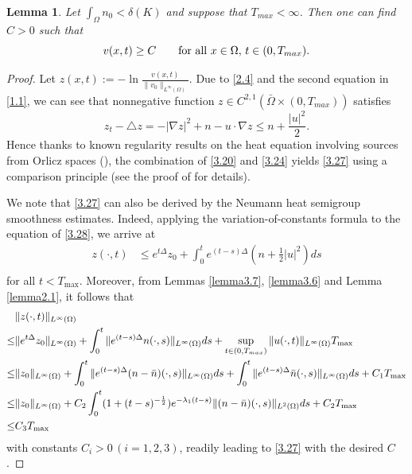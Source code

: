 \documentclass[12pt]{article}
\theoremstyle{plain}
\newtheorem{lemma}{Lemma}[section]
\theoremstyle{definition}
\numberwithin{equation}{section}
\begin{document}
\begin{lemma}\label{lemma3.9}Let $\int_\Omega n_0<\delta(K)$ and suppose that $T_{max}<\infty$.  Then one can find  $C>0$  such that
\begin{equation}\label{3.27}
v(x,t)\geq C\quad\quad \hbox {for all}\,\, x\in \Omega, \,t\in (0,T_{max}).
\end{equation}
\end{lemma}
 \begin{proof}[Proof]
 Let $z(x,t):=-\ln\frac{v(x,t)}{\|v_{0}\|_{L^{\infty}(\Omega)}}$. Due to \eqref{2.4} and the second equation in \eqref{1.1}, we can see that nonnegative function
 $z\in  C^{2,1}(\bar{\Omega}\times(0,T_{max}))$ satisfies
 \begin{equation}\label{3.28}
 z_t-\triangle z=-|\nabla z|^2+n-u\cdot \nabla z\leq n+\frac{|u|^2}2.
\end{equation}
Hence thanks to known regularity results on the heat equation involving sources from Orlicz spaces (\cite [Corollary 1.3]{WinkleIMRN}), the combination of \eqref{3.20} and \eqref{3.24} yields  \eqref{3.27} using a comparison principle (see the proof of \cite [Lemma 3.7]{Fuest} for details).

We note that \eqref{3.27} can also be derived by the Neumann heat semigroup smoothness estimates. Indeed, applying the variation-of-constants formula to the  equation of \eqref{3.28}, we arrive at
	\begin{equation}\label{3.29}
		\begin{split}
			z(\cdot,t)&\leq e^{t\Delta}z_{0}+\int_{0}^{t}e^{(t-s)\Delta}( n+\frac 12 |u|^2) ds\\
					\end{split}
	\end{equation}
	for all $t<T_{\max}$. Moreover, from Lemmas \ref{lemma3.7}, \ref{lemma3.6} and Lemma \ref{lemma2.1},   it follows that
	\begin{align}\label{3.30}
	&\|z(\cdot,t)\|_{L^{\infty}(\Omega)}\notag\\
\leq
&\|e^{t\Delta}z_{0}\|_{L^{\infty}(\Omega)}+\int_{0}^{t}\|e^{(t-s)\Delta}n(\cdot,s)\|_{L^{\infty}(\Omega)}ds
+
\sup_{t\in (0,T_{max})}\|u(\cdot,t)\|_{L^\infty(\Omega)} T_{\max}\\
			\leq
&\|z_{0}\|_{L^{\infty}(\Omega)}+\int_{0}^{t}\|e^{(t-s)\Delta}(n-\bar{n})(\cdot,s)
\|_{L^{\infty}(\Omega)}ds+\int_{0}^{t}\|e^{(t-s)\Delta}\bar{n}(\cdot,s)\|_{L^{\infty}(\Omega)}ds+C_1T_{\max}\notag\\
			\leq
&
\|z_{0}\|_{L^{\infty}(\Omega)}+C_2\int_{0}^{t}(1+(t-s)^{-\frac{1}{2}})e^{-\lambda_{1}(t-s)}\|(n-\bar{n})(\cdot,s)\|_{L^{2}(\Omega)}ds+
C_2T_{\max} \notag \\
\leq& C_3T_{\max}\notag		
	\end{align}
with constants $C_i>0 \, (i=1,2,3)$, readily leading to \eqref{3.27} with the desired $C$.
	\end{proof}
\end{document}
